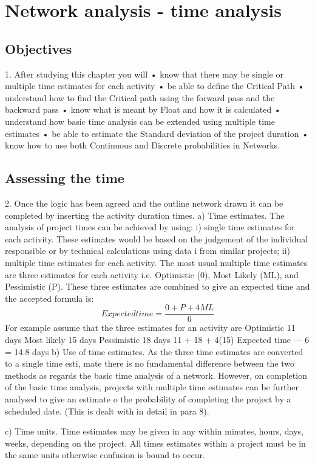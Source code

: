 \documentclass[]{report}
\begin{document}
	
	\section{Network analysis - time analysis}
\subsection{Objectives} 1. After studying this chapter you will 
• know that there may be single or multiple time estimates for each activity • be able to define the Critical Path • understand how to find the Critical path using the forward pass and the backward pass • know what is meant by Float and how it is calculated • understand how basic time analysis can be extended using multiple time estimates • be able to estimate the Standard deviation of the project duration • know how to use both Continuous and Discrete probabilities in Networks. 
\subsection{Assessing the time} 2. Once the logic has been agreed and the outline network drawn it can be completed by inserting the activity duration times. a) Time estimates. The analysis of project times can be achieved by using: i) single time estimates for each activity. These estimates would be based on the judgement of the individual responsible or by technical calculations using data i from similar projects; ii) multiple time estimates for each activity. The most usual multiple time estimates are three estimates for each activity i.e. Optimistic (0), Most Likely (ML), and Pessimistic (P). These three estimates are combined to give an expected time and the accepted formula is: 
\[
Expected time = \frac{0+P+ 4ML}{6}
\]
For example assume that the three estimates for an activity are Optimistic 11 days Most likely 15 days Pessimistic 18 days 11 + 18 + 4(15)  Expected time — 6 = 14.8 days b) Use of time estimates. As the three time estimates are converted to a single time esti, mate there is no fundamental difference between the two methods as regards the basic time analysis of a network. However, on completion of the basic time analysis, projects with multiple time estimates can be further analysed to give an estimate o the probability of completing the project by a scheduled date. (This is dealt with in detail in para 8). 


c) Time units. Time estimates may be given in any within minutes, hours, days, weeks, depending on the project. All times estimates within a project must be in the same units otherwise confusion is bound to occur. 
\end{document}
